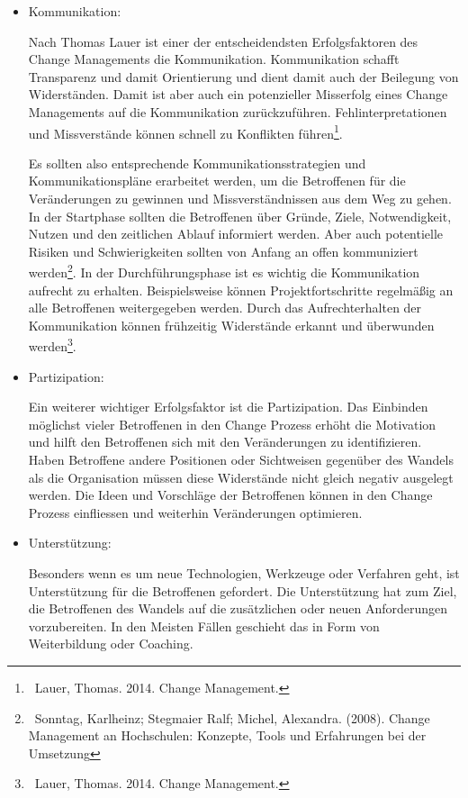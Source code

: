 \documentclass{article}
\begin{document}
\begin{itemize}
\item Kommunikation:

Nach Thomas Lauer ist einer der entscheidendsten Erfolgsfaktoren des Change Managements die Kommunikation. Kommunikation
schafft Transparenz und damit Orientierung und dient damit auch der Beilegung von Widerständen. Damit ist aber auch ein
potenzieller Misserfolg eines Change Managements auf die Kommunikation zurückzuführen. Fehlinterpretationen und
Missverstände können schnell zu Konflikten führen\footnote{\ Lauer, Thomas. 2014. Change Management.}.


\bigskip

Es sollten also entsprechende Kommunikationsstrategien und Kommunikationspläne erarbeitet werden, um die Betroffenen für
die Veränderungen zu gewinnen und Missverständnissen aus dem Weg zu gehen. In der Startphase sollten die Betroffenen
über Gründe, Ziele, Notwendigkeit, Nutzen und den zeitlichen Ablauf informiert werden. Aber auch potentielle Risiken
und Schwierigkeiten sollten von Anfang an offen kommuniziert werden\footnote{\ Sonntag, Karlheinz; Stegmaier Ralf;
Michel, Alexandra. (2008). Change Management an Hochschulen: Konzepte, Tools und Erfahrungen bei der Umsetzung}. In der
Durchführungsphase ist es wichtig die Kommunikation aufrecht zu erhalten. Beispielsweise können Projektfortschritte
regelmäßig an alle Betroffenen weitergegeben werden. Durch das Aufrechterhalten der Kommunikation können frühzeitig
Widerstände erkannt und überwunden werden\footnote{\ Lauer, Thomas. 2014. Change Management.}. 


\bigskip
\item Partizipation:

Ein weiterer wichtiger Erfolgsfaktor ist die Partizipation. Das Einbinden möglichst vieler Betroffenen in den Change
Prozess erhöht die Motivation und hilft den Betroffenen sich mit den Veränderungen zu identifizieren. Haben Betroffene
andere Positionen oder Sichtweisen gegenüber des Wandels als die Organisation müssen diese Widerstände nicht gleich
negativ ausgelegt werden. Die Ideen und Vorschläge der Betroffenen können in den Change Prozess einfliessen und
weiterhin Veränderungen optimieren. 


\bigskip
\item Unterstützung:

Besonders wenn es um neue Technologien, Werkzeuge oder Verfahren geht, ist Unterstützung für die Betroffenen gefordert.
Die Unterstützung hat zum Ziel, die Betroffenen des Wandels auf die zusätzlichen oder neuen Anforderungen
vorzubereiten. In den Meisten Fällen geschieht das in Form von Weiterbildung oder Coaching. 
\end{itemize}
\end{document}
